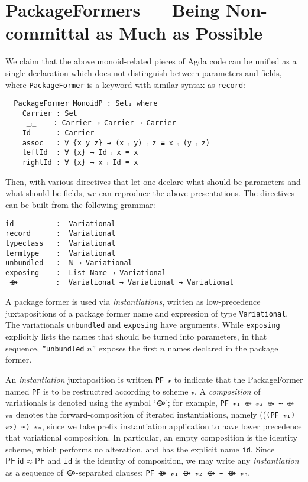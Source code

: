 \documentclass[sigplan,screen]{acmart}
\begin{document}
\section{\textsf{\upshape PackageFormer}s --- Being Non-committal as Much as Possible}
\label{sec:org5f90f47}
We claim that the above monoid-related pieces of Agda code
can be unified as a single declaration
which does not distinguish between parameters and fields,
where \texttt{PackageFormer} is a keyword with similar syntax as \texttt{record}:

\begin{verbatim}
  PackageFormer MonoidP : Set₁ where
    Carrier : Set
     _⨾_    : Carrier → Carrier → Carrier
    Id      : Carrier
    assoc   : ∀ {x y z} → (x ⨾ y) ⨾ z ≡ x ⨾ (y ⨾ z)
    leftId  : ∀ {x} → Id ⨾ x ≡ x
    rightId : ∀ {x} → x ⨾ Id ≡ x
\end{verbatim}

\noindent

 Then, with various directives that let one declare
 what should be parameters and what should be fields,
 we can reproduce the above presentations.
The directives can be built from the following grammar:
\begin{verbatim}
id          :  Variational
record      :  Variational
typeclass   :  Variational
termtype    :  Variational
unbundled   :  ℕ → Variational
exposing    :  List Name → Variational
_⟴_        :  Variational → Variational → Variational
\end{verbatim}

\noindent
  A package former is used via \emph{instantiations}, written as low-precedence
 juxtapositions of a package former name and expression of type
 \texttt{Variational}.
 The variationals \texttt{unbundled} and \texttt{exposing} have arguments.
 While \texttt{exposing} explicitly lists the names that should be turned
 into parameters, in that sequence, \texttt{“unbundled} \(n\)” exposes the
 first \(n\) names declared in the package former.

 An \emph{instantiation} juxtaposition is written \texttt{PF 𝓋} to indicate that the PackageFormer
 named \texttt{PF} is to be restructred according to scheme \texttt{𝓋}. A \emph{composition} of variationals
 is denoted using the symbol ‘⟴’; for example,
 \texttt{PF 𝓋₁ ⟴ 𝓋₂ ⟴ ⋯ ⟴ 𝓋ₙ} denotes the forward-composition of iterated instantiations,
 namely ((\texttt{(PF 𝓋₁) 𝓋₂) ⋯) 𝓋ₙ}, since we take prefix instantiation application
to have lower precedence that variational composition.
 In particular, an empty composition is the identity
 scheme, which performs no alteration, and has the explicit name \texttt{id}.
 Since \(\mathsf{PF} \; \mathsf{id} ≈ \mathsf{PF}\) and \texttt{id} is the identity of composition, we may
 write any \emph{instantiation} as a sequence of \hspace{0.2em} ⟴-separated clauses:
\texttt{PF ⟴ 𝓋₁ ⟴ 𝓋₂ ⟴ ⋯ ⟴ 𝓋ₙ}.
\end{document}
